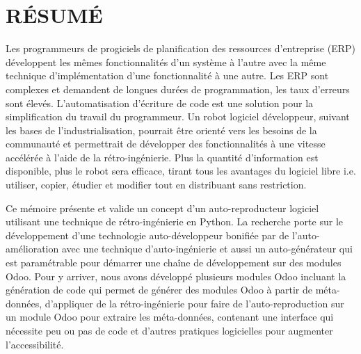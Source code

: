 %
\chapter*{RÉSUMÉ}\thispagestyle{headings}

Les programmeurs de progiciels de planification des ressources d’entreprise (ERP) développent les mêmes fonctionnalités d’un système à l’autre avec la même technique d’implémentation d’une fonctionnalité à une autre. Les ERP sont complexes et demandent de longues durées de programmation, les taux d’erreurs sont élevés. L’automatisation d’écriture de code est une solution pour la simplification du travail du programmeur. Un robot logiciel développeur, suivant les bases de l’industrialisation, pourrait être orienté vers les besoins de la communauté et permettrait de développer des fonctionnalités à une vitesse accélérée à l’aide de la rétro-ingénierie. Plus la quantité d’information est disponible, plus le robot sera efficace, tirant tous les avantages du logiciel libre i.e. utiliser, copier, étudier et modifier tout en distribuant sans restriction.





Ce mémoire présente et valide un concept d'un auto-reproducteur logiciel utilisant une technique de rétro-ingénierie en Python. La recherche porte sur le développement d'une technologie auto-développeur bonifiée par de l'auto-amélioration avec une technique d'auto-ingénierie et aussi un auto-générateur qui est paramétrable pour démarrer une chaîne de développement sur des modules Odoo. Pour y arriver, nous avons développé plusieurs modules Odoo incluant la génération de code qui permet de générer des modules Odoo à partir de méta-données, d'appliquer de la rétro-ingénierie pour faire de l'auto-reproduction sur un module Odoo pour extraire les méta-données, contenant une interface qui nécessite peu ou pas de code et d'autres pratiques logicielles pour augmenter l'accessibilité. 

